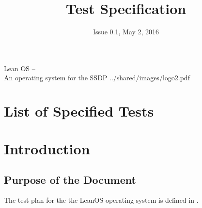 

\title{Test Specification}
\def \documentid {LEANOS-UVIE-TS-001}
\date{Issue 0.1, May 2, 2016}

\newcommand\affil[1]{\textsuperscript#1}

\def\preparedby {Armin Luntzer\affil{1}}
\def\checkedby {Roland Ottensamer\affil{1}}
\def\approvedby {Franz Kerschbaum\affil{1}}

\def\affiliations{
	\affil{1} Department of Astrophysics, University of Vienna
}







\usepackage{enumitem}
\usepackage{vhistory}

\usepackage{biblatex}







\rereadauxdesignlabels





\setmainfont{MyriadPro-SemiCondensed}
\uvietitlepage%
{Lean OS --\\ An operating system for the SSDP}%
{\doctitle}%
{../shared/images/logo2.pdf}
\setmainfont{MyriadPro}

\approvalpage

\tableofcontents
\newpage


\chapter*{List of Specified Tests}
\label{listoftests}
\the\designlist


\begin{versionhistory}
\end{versionhistory}


\chapter{Introduction}


\section{Purpose of the Document}

The test plan for the the LeanOS operating system is defined in
\cite{leanosTP}.\\
\\

